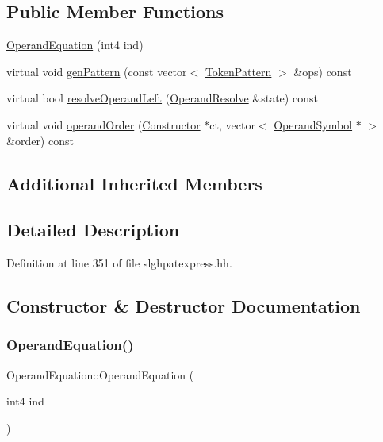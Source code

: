 \subsection*{Public Member Functions}
\begin{DoxyCompactItemize}
\item 
\mbox{\hyperlink{class_operand_equation_a2c7aae70db4d812ff76f6217801813f8}{Operand\+Equation}} (int4 ind)
\item 
virtual void \mbox{\hyperlink{class_operand_equation_a058969ecd084d4b79a36f0d153a3e972}{gen\+Pattern}} (const vector$<$ \mbox{\hyperlink{class_token_pattern}{Token\+Pattern}} $>$ \&ops) const
\item 
virtual bool \mbox{\hyperlink{class_operand_equation_a2a36915c92d63ee68c503a33daa79eda}{resolve\+Operand\+Left}} (\mbox{\hyperlink{struct_operand_resolve}{Operand\+Resolve}} \&state) const
\item 
virtual void \mbox{\hyperlink{class_operand_equation_ae6c672be7a442660c2923112b7dd3a4d}{operand\+Order}} (\mbox{\hyperlink{class_constructor}{Constructor}} $\ast$ct, vector$<$ \mbox{\hyperlink{class_operand_symbol}{Operand\+Symbol}} $\ast$ $>$ \&order) const
\end{DoxyCompactItemize}
\subsection*{Additional Inherited Members}


\subsection{Detailed Description}


Definition at line 351 of file slghpatexpress.\+hh.



\subsection{Constructor \& Destructor Documentation}
\mbox{\label{class_operand_equation_a2c7aae70db4d812ff76f6217801813f8}} 
\subsubsection{\texorpdfstring{OperandEquation()}{OperandEquation()}}
{\footnotesize\ttfamily Operand\+Equation\+::\+Operand\+Equation (\begin{DoxyParamCaption}\item[{int4}]{ind }\end{DoxyParamCaption})\hspace{0.3cm}{\ttfamily [inline]}}




